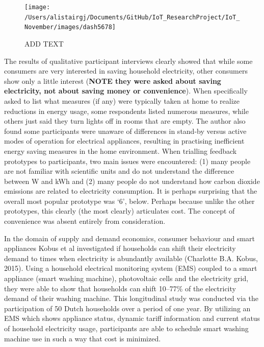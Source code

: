 \documentclass[11pt,]{article}
\begin{document}
\begin{figure}[H]

{\centering \texttt{[image: /Users/alistairgj/Documents/GitHub/IoT\_ResearchProject/IoT\_November/images/dash5678]} 

}

\caption{ADD TEXT}\label{fig:unnamed-chunk-2}
\end{figure}

The results of qualitative participant interviews clearly showed that
while some consumers are very interested in saving household
electricity, other consumers show only a little interest (\textbf{NOTE
they were asked about saving electricity, not about saving money or
convenience}). When specifically asked to list what measures (if any)
were typically taken at home to realize reductions in energy usage, some
respondents listed numerous measures, while others just said they turn
lights off in rooms that are empty. The author also found some
participants were unaware of differences in stand-by versus active modes
of operation for electrical appliances, resulting in practising
inefficient energy saving measures in the home environment. When
trialling feedback prototypes to participants, two main issues were
encountered: (1) many people are not familiar with scientific units and
do not understand the difference between W and kWh and (2) many people
do not understand how carbon dioxide emissions are related to
electricity consumption. It is perhaps surprising that the overall most
popular prototype was `6', below. Perhaps because unlike the other
prototypes, this clearly (the most clearly) articulates cost. The
concept of convenience was absent entirely from consideration.

In the domain of supply and demand economics, consumer behaviour and
smart appliances Kobus et al investigated if households can shift their
electricity demand to times when electricity is abundantly available
(Charlotte B.A. Kobus, 2015). Using a household electrical monitoring
system (EMS) coupled to a smart appliance (smart washing machine),
photovoltaic cells and the electricity grid, they were able to show that
households can shift 10--77\% of the electricity demand of their washing
machine. This longitudinal study was conducted via the participation of
50 Dutch households over a period of one year. By utilizing an EMS which
shows appliance status, dynamic tariff information and current status of
household electricity usage, participants are able to schedule smart
washing machine use in such a way that cost is minimized.
\end{document}
